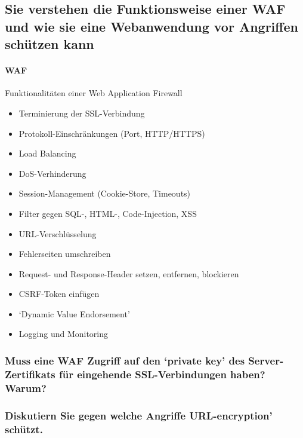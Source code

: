 \documentclass[10pt,a4paper]{article}
\begin{document}
\subsection*{Sie verstehen die Funktionsweise einer WAF und wie sie eine Webanwendung vor Angriffen schützen kann}
\paragraph*{WAF}Funktionalitäten einer Web Application Firewall
\begin{itemize}[noitemsep,topsep=0pt,leftmargin=*]
    \item Terminierung der SSL-Verbindung
    \item Protokoll-Einschränkungen (Port, HTTP/HTTPS)
    \item Load Balancing
    \item DoS-Verhinderung
    \item Session-Management (Cookie-Store, Timeouts)
    \item Filter gegen SQL-, HTML-, Code-Injection, XSS
    \item URL-Verschlüsselung
    \item Fehlerseiten umschreiben
    \item Request- und Response-Header setzen, entfernen, blockieren
    \item CSRF-Token einfügen
    \item `Dynamic Value Endorsement'
    \item Logging und Monitoring
\end{itemize}


\subsubsection*{Muss eine WAF Zugriff auf den `private key' des Server-Zertifikats für eingehende SSL-Verbindungen haben? Warum?}

\subsubsection*{Diskutiern Sie gegen welche Angriffe URL-encryption' schützt.}
\end{document}
